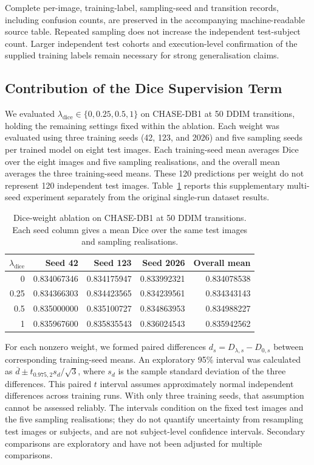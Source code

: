\documentclass[jimaging,article,submit,pdftex,moreauthors]
  {Definitions/mdpi}
\begin{document}
Complete per-image, training-label, sampling-seed and transition records, including confusion counts, are preserved in the accompanying machine-readable source table. Repeated sampling does not increase the independent test-subject count. Larger independent test cohorts and execution-level confirmation of the supplied training labels remain necessary for strong generalisation claims.

\subsection{Contribution of the Dice Supervision Term}
\label{sec:dice_weight_ablation}

We evaluated $\lambda_{\mathrm{dice}}\in\{0,0.25,0.5,1\}$ on CHASE-DB1 at 50 DDIM transitions, holding the remaining settings fixed within the ablation. Each weight was evaluated using three training seeds (42, 123, and 2026) and five sampling seeds per trained model on eight test images. Each training-seed mean averages Dice over the eight images and five sampling realisations, and the overall mean averages the three training-seed means. These 120 predictions per weight do not represent 120 independent test images. Table~\ref{tab:dice_weight_seed_means} reports this supplementary multi-seed experiment separately from the original single-run dataset results.

\begin{table}[htbp]
\centering
\caption{Dice-weight ablation on CHASE-DB1 at 50 DDIM transitions. Each seed column gives a mean Dice over the same test images and sampling realisations.}
\label{tab:dice_weight_seed_means}
\scriptsize
\begin{tabular}{rrrrr}
\toprule
$\lambda_{\mathrm{dice}}$ & Seed 42 & Seed 123 & Seed 2026 & Overall mean \\
\midrule
0 & 0.834067346 & 0.834175947 & 0.833992321 & 0.834078538 \\
0.25 & 0.834366303 & 0.834423565 & 0.834239561 & 0.834343143 \\
0.5 & 0.835000000 & 0.835100727 & 0.834863953 & 0.834988227 \\
1 & 0.835967600 & 0.835835543 & 0.836024543 & 0.835942562 \\
\bottomrule
\end{tabular}
\end{table}

For each nonzero weight, we formed paired differences $d_s=D_{\lambda,s}-D_{0,s}$ between corresponding training-seed means. An exploratory 95\% interval was calculated as $\overline{d}\pm t_{0.975,2}s_d/\sqrt{3}$, where $s_d$ is the sample standard deviation of the three differences. This paired $t$ interval assumes approximately normal independent differences across training runs. With only three training seeds, that assumption cannot be assessed reliably. The intervals condition on the fixed test images and the five sampling realisations; they do not quantify uncertainty from resampling test images or subjects, and are not subject-level confidence intervals. Secondary comparisons are exploratory and have not been adjusted for multiple comparisons.
\end{document}
